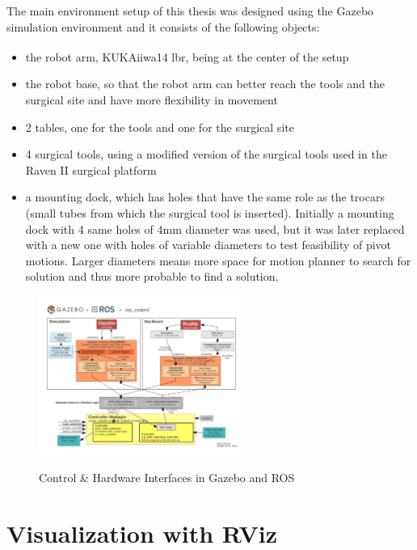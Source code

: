 The main environment setup of this thesis was designed using the Gazebo simulation environment and 
it consists of the following objects:
\begin{itemize}
\item the robot arm, KUKA\textsuperscript \textregistered iiwa14 lbr, being at the center of the setup
\item the robot base, so that the robot arm can better reach the tools and the surgical site and have more flexibility in movement
\item 2 tables, one for the tools and one for the surgical site
\item 4 surgical tools, using a modified version of the surgical tools used in the Raven II surgical platform
\item a mounting dock, which has holes that have the same role as the trocars (small tubes from 
which the surgical tool is inserted). Initially a mounting dock with 4 same holes of 4mm diameter was used, but it was later replaced with a new one with holes of variable diameters to test feasibility of pivot motions. Larger diameters means more space for motion planner to search for solution and thus more probable to find a solution.
\end{itemize}

\begin{center}
\begin{figure}[!htb]
\centering
\includegraphics[width=0.6\textwidth]{images/Gazebo_ros_transmission.png}\\
\caption{Control \& Hardware Interfaces in Gazebo and ROS}
\end{figure}
\end{center}


\section{Visualization with RViz}

